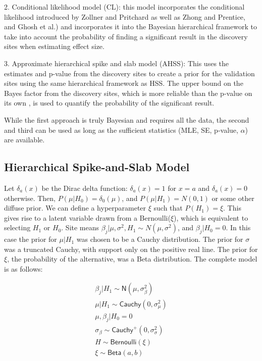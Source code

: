 \documentclass[AMA,STIX1COL]{WileyNJD-v2}\usepackage[]{graphicx}\usepackage[]{color}
\begin{document}
2. Conditional likelihood model (CL): this model incorporates the conditional likelihood introduced by Zollner and Pritchard as well as Zhong and Prentice, and Ghosh et al.)\cite{zollner2007overcoming, zhong2008bias, ghosh2008estimating} and incorporates it into the Bayesian hierarchical framework to take into account the probability of finding a significant result in the discovery sites when estimating effect size. 

3. Approximate hierarchical spike and slab model (AHSS): This uses the estimates and p-value from the discovery sites to create a prior for the validation sites using the same hierarchical framework as HSS. The upper bound on the Bayes factor from the discovery sites, which is more reliable than the p-value on its own \cite{benjamin2017redefine}, is used to quantify the probability of the significant result.

While the first approach is truly Bayesian and requires all the data, the second and third can be used as long as the sufficient statistics (MLE, SE, p-value, $\alpha$) are available. 


\subsection{Hierarchical Spike-and-Slab Model}

Let $\delta_a(x)$ be the Dirac delta function: $\delta_a(x) = 1$ for $x = a$ and $\delta_a(x)=0$ otherwise. Then, $P( \mu|H_0) = \delta_0 ( \mu )$,  and $P( \mu|H_1) = N(0,1)$ or some other diffuse prior. We can define a hyperparameter $\xi$ such that $P(H_1) = \xi$. This gives rise to a latent variable drawn from a Bernoulli($\xi$), which is equivalent to selecting $H_1$ or $H_0$. Site means $\beta_{j}|\mu, \sigma^2,H_1 \sim N(\mu, \sigma^2)$, and $\beta_{j}|H_0 = 0$. In this case the prior for  $\mu| H_1$ was chosen to be a Cauchy distribution. The prior for $\sigma$ was a truncated Cauchy, with support only on the positive real line. The prior for $\xi$, the probability of the alternative, was a Beta distribution.  The complete model is as follows:

\begin{gather}\label{eq3}
\beta_{j}|H_ 1 \sim \textsf{N}(\mu, \sigma_{\beta}^{2}) \\
\mu|H_1\sim \textsf{Cauchy}(0,\sigma_{\mu}^{2})\\
\mu, \beta_{j}|H_0  =0\\
\sigma_{\beta}\sim \textsf{Cauchy}^+(0,\sigma_{\sigma}^{2})\\
H\sim \textsf{Bernoulli}(\xi)\\
\xi \sim \textsf{Beta}(a, b)
\end{gather}
\end{document}
